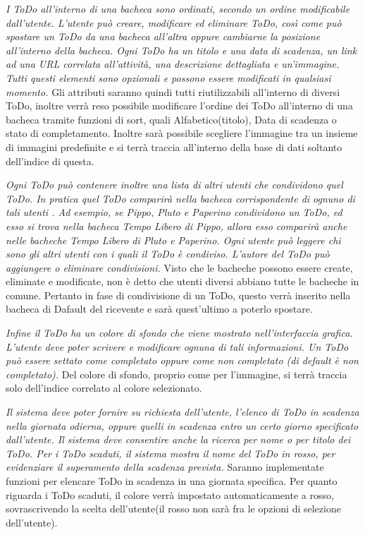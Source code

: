 \documentclass{article}
\begin{document}
	\textit{I ToDo all’interno di una bacheca sono ordinati, secondo un ordine modificabile dall’utente. L’utente può creare, modificare ed eliminare ToDo, così come può spostare un ToDo da una bacheca all’altra oppure cambiarne la posizione all’interno della bacheca.
	Ogni ToDo ha un titolo e una data di scadenza, un link ad una URL correlata all’attività, una descrizione dettagliata e un’immagine. Tutti questi elementi sono opzionali e possono essere modificati in qualsiasi momento.} \linebreak
	Gli attributi saranno quindi tutti riutilizzabili all'interno di diversi ToDo, inoltre verrà reso possibile modificare l'ordine dei ToDo all'interno di una bacheca tramite funzioni di sort, quali Alfabetico(titolo), Data di scadenza o stato di completamento. Inoltre sarà possibile scegliere l'immagine tra un insieme di immagini predefinite e si terrà traccia all'interno della base di dati soltanto dell'indice di questa. \linebreak[2]
	
	\textit{Ogni ToDo può contenere inoltre una lista di altri utenti che condividono quel ToDo. In pratica quel ToDo comparirà nella bacheca corrispondente di ognuno di tali utenti . Ad esempio, se Pippo, Pluto e Paperino condividono un ToDo, ed esso si trova nella bacheca Tempo Libero di Pippo, allora esso comparirà anche nelle bacheche Tempo Libero di Pluto e Paperino. Ogni utente può leggere chi sono gli altri utenti con i quali il ToDo è condiviso. L’autore del ToDo può aggiungere o eliminare condivisioni.} \linebreak
	Visto che le bacheche possono essere create, eliminate e modificate, non è detto che utenti diversi abbiano tutte le bacheche in comune. Pertanto in fase di condivisione di un ToDo, questo verrà inserito nella bacheca di Dafault del ricevente e sarà quest'ultimo a poterlo spostare. \linebreak[2]
	
	\textit{Infine il ToDo ha un colore di sfondo che viene mostrato nell’interfaccia grafica. L’utente deve poter scrivere e modificare ognuna di tali informazioni. Un ToDo può essere settato come completato oppure come non completato (di default è non completato).} \linebreak
	Del colore di sfondo, proprio come per l'immagine, si terrà traccia solo dell'indice correlato al colore selezionato. \linebreak[2]
	
	\textit{Il sistema deve poter fornire su richiesta dell’utente, l’elenco di ToDo in scadenza nella giornata odierna, oppure quelli in scadenza entro un certo giorno specificato dall’utente. Il sistema deve consentire anche la ricerca per nome o per titolo dei ToDo.
	Per i ToDo scaduti, il sistema mostra il nome del ToDo in rosso, per evidenziare il superamento della scadenza prevista.} \linebreak
	Saranno implementate funzioni per elencare ToDo in scadenza in una giornata specifica. Per quanto riguarda i ToDo scaduti, il colore verrà impostato automaticamente a rosso, sovrascrivendo la scelta dell'utente(il rosso non sarà fra le opzioni di selezione dell'utente).
	\pagebreak
	
\end{document}
